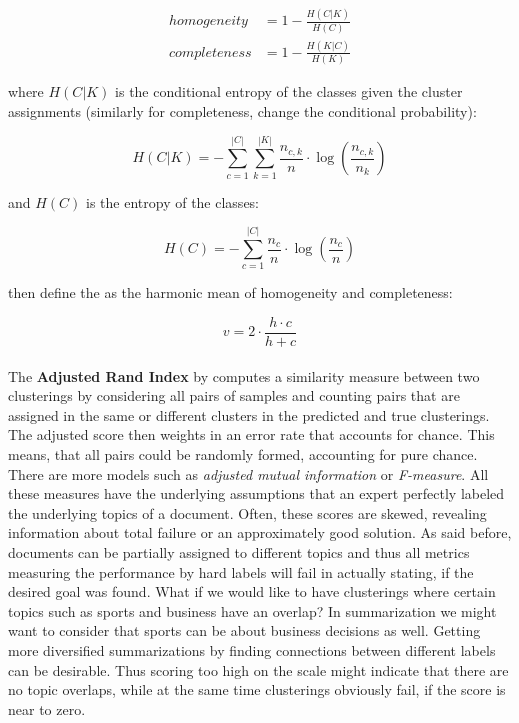       \begin{equation}
      \begin{split}
        homogeneity   &= 1 - \frac{H(C|K)}{H(C)}\\
        completeness  &= 1 - \frac{H(K|C)}{H(K)}
      \end{split}
      \end{equation}

    where $H(C|K)$ is the conditional entropy of the classes given the cluster assignments (similarly for completeness, change the conditional probability):

      \begin{equation}
        H(C|K) = - \sum_{c=1}^{|C|} \sum_{k=1}^{|K|} \frac{n_{c,k}}{n}\cdot \log\left(\frac{n_{c,k}}{n_k}\right)
      \end{equation}

    and $H(C)$ is the entropy of the classes:

      \begin{equation}
        H(C) = - \sum_{c=1}^{|C|} \frac{n_c}{n} \cdot \log\left(\frac{n_c}{n}\right)
      \end{equation}

    \cite{VMeasure2007} then define the \vmeasure{} as the harmonic mean of homogeneity and completeness:

      \begin{equation}
        v = 2 \cdot \frac{h \cdot c}{h + c}
      \end{equation}

    \paragraph{} The \textbf{Adjusted Rand Index} by \cite{RandIndex1971} computes a similarity measure between two clusterings by considering all pairs of samples and counting pairs that are assigned in the same or different clusters in the predicted and true clusterings. The adjusted score then weights in an error rate that accounts for chance. This means, that all pairs could be randomly formed, accounting for pure chance.\\

  There are more models such as \emph{adjusted mutual information} or \emph{F-measure}. All these measures have the underlying assumptions that an expert perfectly labeled the underlying topics of a document. Often, these scores are skewed, revealing information about total failure or an approximately good solution. As said before, documents can be partially assigned to different topics and thus all metrics measuring the performance by hard labels will fail in actually stating, if the desired goal was found. What if we would like to have clusterings where certain topics such as sports and business have an overlap? In summarization we might want to consider that sports can be about business decisions as well. Getting more diversified summarizations by finding connections between different labels can be desirable. Thus scoring too high on the \vmeasure{} scale might indicate that there are no topic overlaps, while at the same time clusterings obviously fail, if the score is near to zero.

